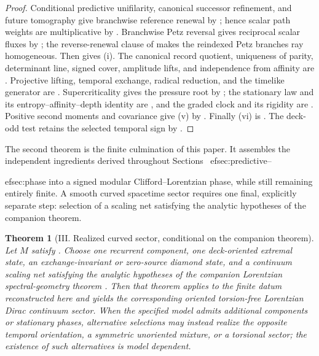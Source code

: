 \documentclass[11pt]{article}
\newtheorem{theorem}{Theorem}[section]
\theoremstyle{definition}
\theoremstyle{remark}
\begin{document}
\begin{proof}
Conditional predictive unifilarity, canonical successor refinement, and future
tomography give branchwise reference renewal by
; hence scalar
path weights are multiplicative by
.
Branchwise Petz reversal gives reciprocal scalar fluxes by
; the
reverse-renewal clause of  makes the reindexed Petz
branches ray homogeneous.  Then
 gives (i).
The canonical record quotient, uniqueness of parity, determinant line, signed
cover, amplitude lifts, and independence from affinity are
.
Projective lifting, temporal exchange, radical reduction, and the timelike
generator are
.
Supercriticality gives the pressure root by ; the
stationary law and its entropy--affinity--depth identity are
, and the graded clock and
its rigidity are .  Positive second moments and
covariance give (v) by .  Finally (vi) is
.  The deck-odd test retains the selected temporal
sign by .
\end{proof}

The second theorem is the finite culmination of this paper.  It assembles the
independent ingredients derived throughout Sections~
ef{sec:predictive}--

ef{sec:phase} into a signed modular Clifford--Lorentzian phase, while still
remaining entirely finite.  A smooth curved spacetime sector requires one final,
explicitly separate step: selection of a scaling net satisfying the analytic
hypotheses of the companion theorem.

\begin{theorem}[III. Realized curved sector, conditional on the companion theorem]
\label{thm:realized-curved-sector}
Let $M$ satisfy .  Choose one recurrent component,
one deck-oriented extremal state, an exchange-invariant or zero-source diamond
state, and a continuum scaling net satisfying the analytic hypotheses of the
companion Lorentzian spectral-geometry theorem
\cite{PelissierLorentzian2026}.  Then that theorem applies to the finite datum
reconstructed here and yields the corresponding oriented torsion-free
Lorentzian Dirac continuum sector.  When the specified model admits additional
components or stationary phases, alternative selections may instead realize the
opposite temporal orientation, a symmetric unoriented mixture, or a torsional
sector; the existence of such alternatives is model dependent.
\end{theorem}
\end{document}
